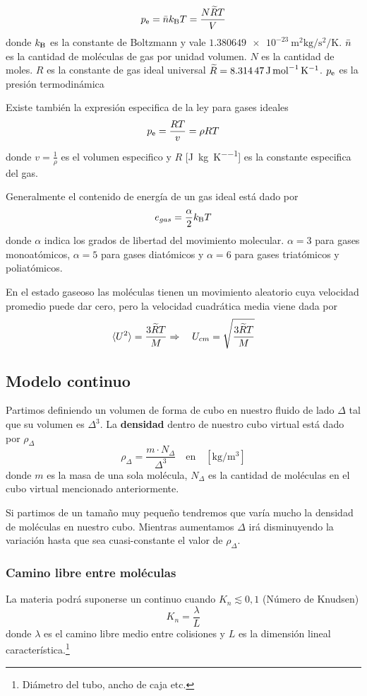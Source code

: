 \begin{equation} \label{eq:idealGasesLaw}
    \pe= \moldens \boltzmann T=\frac{N\overtilde{R}T}{V}
\end{equation}
donde $\boltzmann$ es la constante de Boltzmann y vale $\SI{1.380649e-23}{\meter \squared \kilogram \per \second \squared \per \kelvin}$. $\bar{n}$ es la cantidad de moléculas de gas por unidad volumen. $N$ es la cantidad de moles. $R$ es la constante de gas ideal universal $\widetilde{R}=\SI{8,31447}{\joule \per \mole \per \kelvin}$. $\pe$ es la presión termodinámica

Existe también la expresión especifica de la ley para gases ideales
\[
\pe = \frac{RT}{v} = \rho R T
\]
donde $v=\frac{1}{\rho}$ es el volumen especifico y  $R$ [\si{\joule \per \kilogram \per \kelvin}] es la constante especifica del gas.

Generalmente el contenido de energía de un gas ideal está dado por
\begin{equation}
    e_{gas}=\frac{\alpha}{2}\boltzmann T
\end{equation}
donde $\alpha$ indica los grados de libertad del movimiento molecular. $\alpha=3$ para gases monoatómicos, $\alpha=5$ para gases diatómicos y $\alpha=6$ para gases triatómicos y poliatómicos.

En el estado gaseoso las moléculas tienen un movimiento aleatorio cuya velocidad promedio puede dar cero, pero la velocidad cuadrática media viene dada por
\[
\langle U^2 \rangle = \frac{3\widetilde{R}T}{M} \Rightarrow \quad U_{cm}=\sqrt{\frac{3\widetilde{R}T}{M}}
\]

\subsection{Modelo continuo}
Partimos definiendo un volumen de forma de cubo en nuestro fluido de lado $\Delta$ tal que su volumen es $\Delta^3$. La \textbf{densidad}  dentro de nuestro cubo virtual está dado por $\rho_\Delta$ 
\[
\rho_\Delta = \frac{m\cdot N_\Delta}{\Delta^3} \quad \textrm{en} \quad [\si{\kilogram \per \meter \cubed}]
\]
donde $m$ es la masa de una sola molécula, $N_\Delta$ es la cantidad de moléculas en el cubo virtual mencionado anteriormente.

Si partimos de un tamaño muy pequeño tendremos que varía mucho la densidad de moléculas en nuestro cubo. Mientras aumentamos $\Delta$ irá disminuyendo la variación hasta que sea cuasi-constante el valor de $\rho_\Delta$. 

\subsubsection*{Camino libre entre moléculas}
La materia podrá suponerse un continuo cuando $K_n\lesssim 0,1$ (Número de Knudsen)
\[
K_n = \frac{\lambda}{L}
\]
donde $\lambda$ es el camino libre medio entre colisiones y $L$ es la dimensión lineal característica.\footnote{Diámetro del tubo, ancho de caja etc.}

